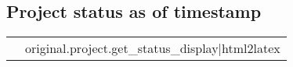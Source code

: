 \subsection*{Project status as of {{ timestamp }}}
\begin{tabu} {X X}
& {{ original.project.get_status_display|html2latex }}\\
\end{tabu}
